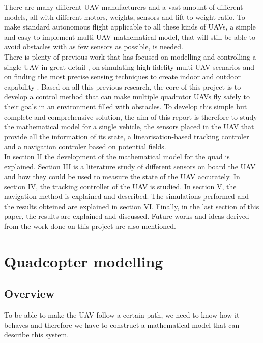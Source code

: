 \documentclass[journal, twoside]{IEEEtran}
\begin{document}
	There are many different UAV manufacturers and a vast amount of different models, all with different motors, weights, sensors and lift-to-weight ratio. To make standard autonomous flight applicable to all these kinds of UAVs, a simple and easy-to-implement multi-UAV mathematical model, that will still be able to avoid obstacles with as few sensors as possible, is needed.\\
	
	 There is plenty of previous work that has focused on modelling and controlling a single UAV in great detail \cite{intro_nolinear_model_control, mod_control_bresciani}, on simulating high-fidelity multi-UAV scenarios \cite{intro_3d_unity} and on finding the most precise sensing techniques to create indoor and outdoor capability \cite{intro_indoor_sensing}. Based on all this previous research, the core of this project is to develop a control method that can make multiple quadrotor UAVs fly safely to their goals in an environment filled with obstacles. To develop this simple but complete and comprehensive solution, the aim of this report is therefore to study the mathematical model for a single vehicle, the sensors placed in the UAV that provide all the information of its state, a linearisation-based tracking controler and a navigation controler based on potential fields. \\
	
	In section II the development of the mathematical model for the quad is explained. Section III is a literature study of different sensors on board the UAV and how they could be used to measure the state of the UAV accurately. In section IV, the tracking controller of the UAV is studied. In section V, the navigation method  is explained and described. The simulations performed and the results obteined are explained in section VI. Finally, in the last section of this paper, the results are explained and discussed. Future works and ideas derived from the work done on this project are also mentioned.

	\hfill 	
	
	
	\section{Quadcopter modelling}
	\subsection{Overview}
	To be able to make the UAV follow a certain path, we need to know how it behaves and therefore we have to construct a mathematical model that can describe this system.\\
	
\end{document}
